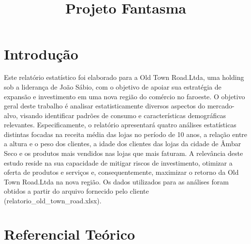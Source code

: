 \documentclass[
]{estat/estat}
\title{Projeto Fantasma}
\author{}
\date{}
\let\oldsection\section
\renewcommand\section{\clearpage\oldsection}
\renewcommand*\contentsname{Índice}
\newcommand\contentsname{Índice}
\begin{document}
\maketitle

\fancyhf{} 

\fancyhead[L]{} %
\renewcommand{\headrulewidth}{0pt}   %

\fancyfoot[R]{\textcolor{white}{\thepage}} %

\pagestyle{fancy} 



\renewcommand*\contentsname{Sumário}
{
\hypersetup{linkcolor=}
\setcounter{tocdepth}{3}
\tableofcontents
}

\section{Introdução}\label{introduuxe7uxe3o}

Este relatório estatístico foi elaborado para a Old Town Road.Ltda, uma
holding sob a liderança de João Sábio, com o objetivo de apoiar sua
estratégia de expansão e investimento em uma nova região do comércio no
faroeste. O objetivo geral deste trabalho é analisar estatisticamente
diversos aspectos do mercado-alvo, visando identificar padrões de
consumo e características demográficas relevantes. Especificamente, o
relatório apresentará quatro análises estatísticas distintas focadas na
receita média das lojas no período de 10 anos, a relação entre a altura
e o peso dos clientes, a idade dos clientes das lojas da cidade de Âmbar
Seco e os produtos mais vendidos nas lojas que mais faturam. A
relevância deste estudo reside na sua capacidade de mitigar riscos de
investimento, otimizar a oferta de produtos e serviços e,
consequentemente, maximizar o retorno da Old Town Road.Ltda na nova
região. Os dados utilizados para as análises foram obtidos a partir do
arquivo fornecido pelo cliente (relatorio\_old\_town\_road.xlsx).

\section{Referencial Teórico}\label{referencial-teuxf3rico}
\end{document}
